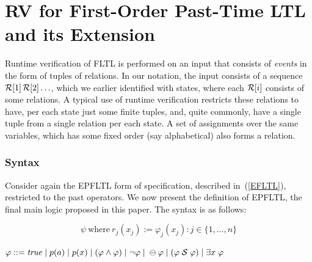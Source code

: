 \section{RV for First-Order Past-Time LTL and its Extension}
\label{EPLTLRV}

Runtime verification of FLTL is performed on an
input that consists of {\em events} in the form of
tuples of relations. In our notation, the input
consists of a sequence ${\cal R}[1] \, {\cal R}[2]  \ldots$,
which we earlier identified with states, where each
${\cal R}[i]$ consists of some relations. A typical use
of runtime verification restricts these relations to have,
per each state just some finite tuples, and, quite commonly, have a single tuple from a single relation per each state.
A set of assignments over the same variables, which has some fixed order
(say alphabetical) also forms a relation.


\subsubsection{Syntax}


Consider again the EPFLTL form
of specification, described in~(\ref{EFLTL}), restricted to the past operators. We now present the definition of EPFLTL, the final main logic proposed in this paper. 
The syntax is as follows:


\[ 
\psi \mathrm{\ where\ } r_j ( x_j) := 
\varphi_j (x_j) : j \in \{ 1 , \ldots , n \}
\]
\begin{center}
$\varphi ::= \mathit{true}  \; | \;
    p ( a ) \; | \;
    p ( x ) \; | \;
    ( \varphi \wedge \varphi ) \;  |   \;
   \neg \varphi \; | \;
    \ominus \varphi \; | \;
    ( \varphi  \; {\cal S}  \; \varphi ) \; | \;
    \exists x \; \varphi$
\end{center}



